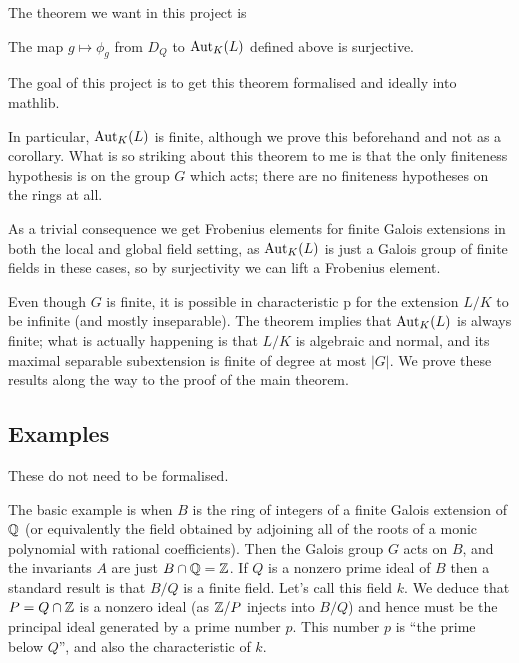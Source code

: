 The theorem we want in this project is
\begin{theorem}
  \label{Bourbaki52222.MulAction.stabilizer_surjective_of_action}
  The map $g\mapsto \phi_g$ from $D_Q$ to $\operatorname{Aut}_K(L)$ defined above is surjective.
\end{theorem}

The goal of this project is to get this theorem formalised and ideally into mathlib.

In particular, $\operatorname{Aut}_K(L)$ is finite, although we prove this beforehand and not
as a corollary. What is so striking about this theorem to me is that the only finiteness hypothesis
is on the group $G$ which acts; there are no finiteness hypotheses on the rings at all.

As a trivial consequence we get Frobenius elements for finite Galois extensions in both
the local and global field setting, as $\operatorname{Aut}_K(L)$ is just a Galois group of finite fields
in these cases, so by surjectivity we can lift a Frobenius element.

Even though $G$ is finite, it is possible in characteristic p for the extension $L/K$ to be
infinite (and mostly inseparable). The theorem implies that $\operatorname{Aut}_K(L)$ is always finite;
what is actually happening is that $L/K$ is algebraic and normal, and its maximal separable
subextension is finite of degree at most $|G|$. We prove these results along the way to the
proof of the main theorem.

\subsection{Examples}

These do not need to be formalised.

The basic example is when $B$ is the ring of integers of a finite Galois extension of $\mathbb{Q}$
(or equivalently the field obtained by adjoining all of the roots of
a monic polynomial with rational coefficients).
Then the Galois group $G$ acts on $B$, and the invariants $A$ are just $B\cap\mathbb{Q}=\mathbb{Z}$. If $Q$
is a nonzero prime ideal of $B$ then a standard result is that $B/Q$ is a finite field. Let's
call this field $k$. We deduce that $P=Q\cap \mathbb{Z}$ is a nonzero ideal (as $\mathbb{Z}/P$ injects into $B/Q$)
and hence must be
the principal ideal generated by a prime number $p$. This number $p$ is ``the prime below $Q$'',
and also the characteristic of $k$.

